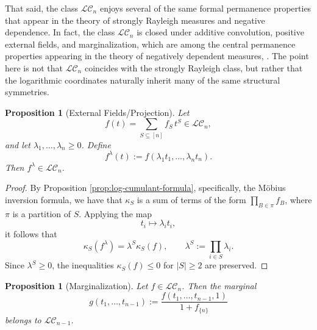 \documentclass[11pt]{amsart}
\newtheorem{prop}[thm]{Proposition}
\theoremstyle{definition}
\begin{document}
That said, the class $\mathcal{LC}_n$ enjoys several of the same formal permanence properties that appear in the theory of strongly Rayleigh measures and negative dependence. In fact, the class $\mathcal{LC}_n$ is closed under additive convolution, positive external fields, and marginalization, which are among the central permanence properties appearing in the theory of negatively dependent measures, \cite{Pem00,BBL09}.  The point here is not that $\mathcal{LC}_n$ coincides with the strongly Rayleigh class, but rather that the logarithmic coordinates naturally inherit many of the same structural symmetries.

\begin{prop}[External Fields/Projection]
\label{prop:LC-external-fields}
Let
\[
  f(t)=\sum_{S\subseteq[n]} f_S\, t^S
  \in \mathcal{LC}_n,
\]
and let $\lambda_1,\dots,\lambda_n \ge 0$.
Define
\[
  f^\lambda(t)
  :=
  f(\lambda_1 t_1,\dots,\lambda_n t_n).
\]
Then $f^\lambda\in\mathcal{LC}_n$.
\end{prop}

\begin{proof}
By Proposition \ref{prop:log-cumulant-formula}, specifically, the M\"obius inversion formula, we have that $\kappa_S$ is a sum of terms of the form $\prod_{B\in \pi} f_B$, where $\pi$ is a partition of $S$.
Applying the map
\[
  t_i\mapsto \lambda_i t_i,
\]
it follows that
\[
  \kappa_S(f^\lambda)
  =
  \lambda^S \kappa_S(f),
  \qquad
  \lambda^S:=\prod_{i\in S}\lambda_i.
\]
Since $\lambda^S \ge 0$, the inequalities $\kappa_S(f)\le 0$ for $|S|\ge 2$ are preserved.
\end{proof}

\begin{prop}[Marginalization]
\label{prop:LC-marginalization}
Let $f\in\mathcal{LC}_n$.  Then the marginal
\[
  g(t_1,\dots,t_{n-1})
  :=
  \frac{f(t_1,\dots,t_{n-1},1)}{1 + f_{\{n\}}}
\]
belongs to $\mathcal{LC}_{n-1}$.
\end{prop}
\end{document}
